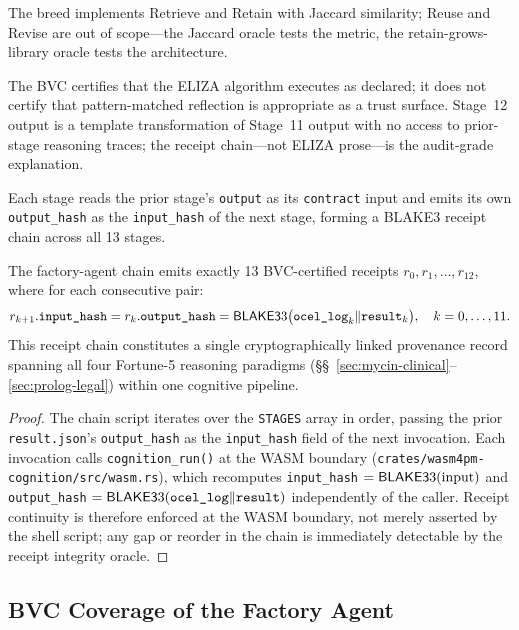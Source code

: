 \noindent The breed implements Retrieve and Retain with Jaccard similarity; Reuse and Revise are out of scope---the Jaccard oracle tests the metric, the retain-grows-library oracle tests the architecture.

\begin{remark}
The BVC certifies that the ELIZA algorithm executes as declared; it does not certify that pattern-matched reflection is appropriate as a trust surface. Stage~12 output is a template transformation of Stage~11 output with no access to prior-stage reasoning traces; the receipt chain---not ELIZA prose---is the audit-grade explanation.
\end{remark}

Each stage reads the prior stage's \texttt{output} as its \texttt{contract} input and
emits its own \texttt{output\_hash} as the \texttt{input\_hash} of the next stage,
forming a BLAKE3 receipt chain across all 13 stages.

\begin{proposition}
\label{prop:factory-receipt-continuity}
The factory-agent chain emits exactly 13 BVC-certified receipts
$r_0, r_1, \ldots, r_{12}$, where for each consecutive pair:
\[
  r_{k+1}.\texttt{input\_hash} = r_k.\texttt{output\_hash}
  = \mathsf{BLAKE3}3\bigl(\texttt{ocel\_log}_k \Vert \texttt{result}_k\bigr),
  \quad k = 0,\ldots,11.
\]
This receipt chain constitutes a single cryptographically linked provenance record
spanning all four Fortune-5 reasoning paradigms (\S\S~\ref{sec:mycin-clinical}--\ref{sec:prolog-legal}) within one cognitive pipeline.
\end{proposition}

\begin{proof}
The chain script iterates over the \texttt{STAGES} array in order, passing the prior
\texttt{result.json}'s \texttt{output\_hash} as the \texttt{input\_hash} field of the
next invocation. Each invocation calls \texttt{cognition\_run()} at the WASM boundary
(\texttt{crates/wasm4pm-cognition/src/wasm.rs}), which recomputes \texttt{input\_hash}
$= \mathsf{BLAKE3}3(\text{input})$ and \texttt{output\_hash}
$= \mathsf{BLAKE3}3(\texttt{ocel\_log} \Vert \texttt{result})$ independently of the caller.
Receipt continuity is therefore enforced at the WASM boundary, not merely asserted by
the shell script; any gap or reorder in the chain is immediately detectable by the
receipt integrity oracle.
\end{proof}

\subsection{BVC Coverage of the Factory Agent}
\label{subsec:factory-bvc-coverage}

